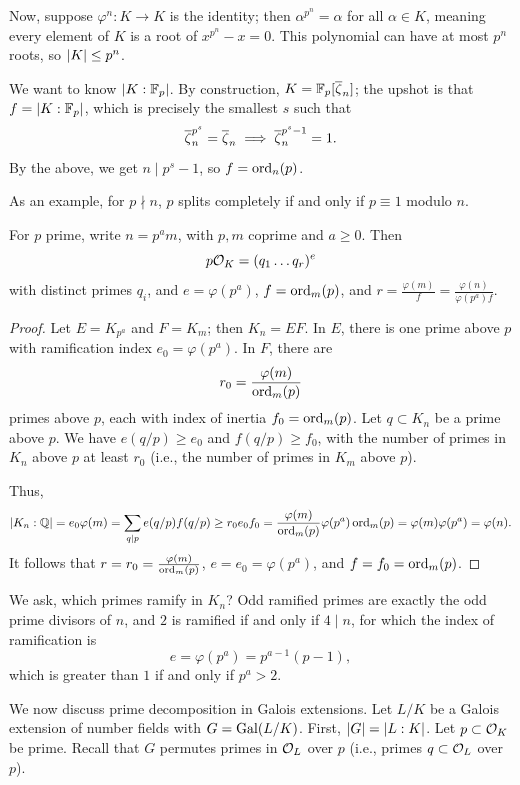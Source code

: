 Now, suppose $\varphi^n \colon K \to K$ is the identity; then $\alpha^{p^n} = \alpha$ for all $\alpha \in K$, meaning every element of $K$ is a root of $x^{p^n} - x = 0$. This polynomial can have at most $p^n$ roots, so $\left\lvert K \right\rvert \leq p^n$.

We want to know $\left\lvert K : \mathbb F_p \right\rvert$. By construction, $K = \mathbb F_p[\overline \zeta_n]$; the upshot is that $f = \left\lvert K : \mathbb F_p \right\rvert$, which is precisely the smallest $s$ such that
\[ \overline \zeta_n^{p^s} = \overline \zeta_n \implies \overline \zeta_n^{p^s - 1} = 1. \]
By the above, we get $n \mid p^s - 1$, so $f = \operatorname{ord}_n(p)$.

As an example, for $p \nmid n$, $p$ splits completely if and only if $p \equiv 1$ modulo $n$.
\begin{theorem} \label{thm:ramification_inertia_number_of_primes_for_cyclotomic_pt2}
    For $p$ prime, write $n = p^a m$, with $p, m$ coprime and $a \geq 0$. Then
    \[ p \mathcal O_K = (q_1 \dots q_r)^e \]
    with distinct primes $q_i$, and $e = \varphi(p^a)$, $f = \operatorname{ord}_m(p)$, and $r = \frac{\varphi(m)}{f} = \frac{\varphi(n)}{\varphi(p^a) f}$.
\end{theorem}
\begin{proof}
    Let $E = K_{p^a}$ and $F = K_m$; then $K_n = EF$. In $E$, there is one prime above $p$ with ramification index $e_0 = \varphi(p^a)$. In $F$, there are
    \[ r_0 = \frac{\varphi(m)}{\operatorname{ord}_m(p)} \]
    primes above $p$, each with index of inertia $f_0 = \operatorname{ord}_m(p)$. Let $q \subset K_n$ be a prime above $p$. We have $e(q / p) \geq e_0$ and $f(q / p) \geq f_0$, with the number of primes in $K_n$ above $p$ at least $r_0$ (i.e., the number of primes in $K_m$ above $p$).
    
    \newpage
    Thus,
    \[ \left\lvert K_n : \mathbb Q \right\rvert = e_0 \varphi(m) = \sum_{q \mid p} e(q / p) f(q / p) \geq r_0 e_0 f_0 = \frac{\varphi(m)}{\operatorname{ord}_m(p)} \varphi(p^a) \operatorname{ord}_m(p) = \varphi(m) \varphi(p^a) = \varphi(n). \]
    It follows that $r = r_0 = \frac{\varphi(m)}{\operatorname{ord}_m(p)}$, $e = e_0 = \varphi(p^a)$, and $f = f_0 = \operatorname{ord}_m(p)$.
\end{proof}

We ask, which primes ramify in $K_n$? Odd ramified primes are exactly the odd prime divisors of $n$, and $2$ is ramified if and only if $4 \mid n$, for which the index of ramification is
\[ e = \varphi(p^a) = p^{a-1} (p - 1), \]
which is greater than $1$ if and only if $p^a > 2$.

We now discuss prime decomposition in Galois extensions. Let $L/K$ be a Galois extension of number fields with $G = \operatorname{Gal}(L/K)$. First, $\left\lvert G \right\rvert = \left\lvert L : K \right\rvert$. Let $p \subset \mathcal O_K$ be prime. Recall that $G$ permutes primes in $\mathcal O_L$ over $p$ (i.e., primes $q \subset \mathcal O_L$ over $p$).

